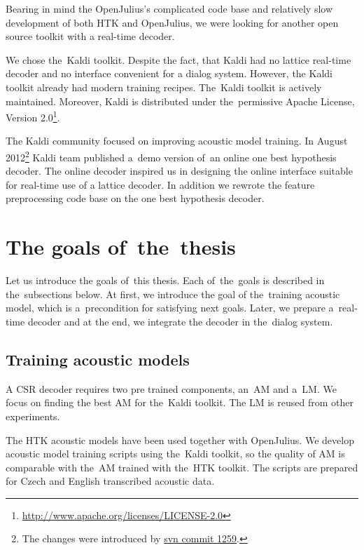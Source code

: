 Bearing in mind the OpenJulius's complicated code base and relatively slow
development of both \ac{HTK} and OpenJulius, we were looking 
for another open source toolkit with a real-time decoder.

We chose the~Kaldi toolkit. Despite the fact,  that Kaldi had no lattice real-time decoder
and no interface convenient for a dialog system.
However, the Kaldi toolkit already had modern training recipes.
The~Kaldi toolkit is actively maintained. Moreover, Kaldi is distributed 
under the~permissive Apache License, Version 2.0\footnote{\url{http://www.apache.org/licenses/LICENSE-2.0}}.

The Kaldi community focused on improving acoustic model training. 
In August 2012\footnote{The changes were introduced by \href{https://sourceforge.net/p/kaldi/code/1259/}{svn commit 1259}.}
Kaldi team published a~demo version of~an online one best hypothesis decoder.
The online decoder inspired us in designing 
the online interface suitable for real-time use of a lattice decoder.
In addition we rewrote the feature preprocessing code base on the one best hypothesis decoder.

\section{The goals of~the~thesis} 
\label{sec:goals}
Let us introduce the goals of~this thesis. Each of~the~goals is described in the~subsections below.
At first, we introduce the goal of the~training acoustic model, which is a~precondition for satisfying next goals.
Later, we prepare a~real-time decoder and at the end, we integrate the decoder in the~dialog system. 

\subsection{Training acoustic models} 
\label{sub:training_kaldi_acoustic_models}
A \acl{CSR} decoder requires two pre trained components, an~\acl{AM} and 
a~\acl{LM}. We focus on finding the best \acl{AM} for the~Kaldi toolkit. 
The \acl{LM} is reused from other experiments.

The \ac{HTK} acoustic models have been used together with OpenJulius. 
We develop acoustic model training scripts using the~Kaldi toolkit,
so the quality of \ac{AM} is comparable with the~\ac{AM} trained with the~\ac{HTK} toolkit. 
The scripts are prepared for Czech and English transcribed acoustic data.

 

